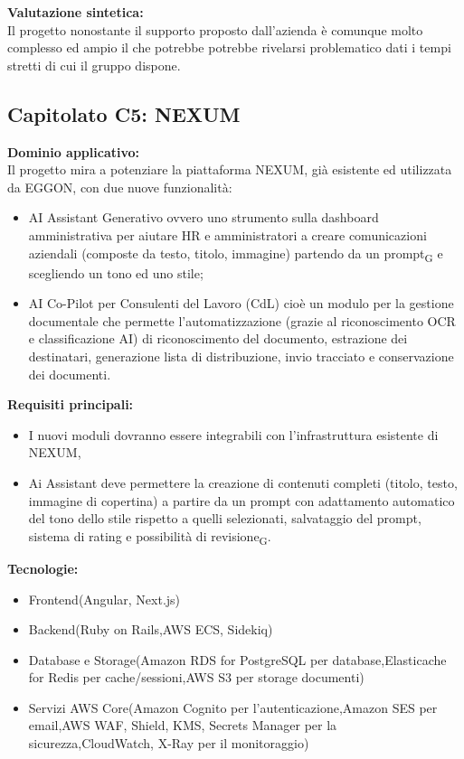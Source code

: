 \vspace{0.3cm}
\textbf{Valutazione sintetica:} \\
Il progetto nonostante il supporto proposto dall'azienda è comunque molto complesso ed ampio il che potrebbe potrebbe rivelarsi problematico dati i 
tempi stretti di cui il gruppo dispone.

\vspace{0.5cm}

\vspace{0.5cm}

\subsection{Capitolato C5: {NEXUM} }

\textbf{Dominio applicativo:} \\
{Il progetto mira a potenziare la piattaforma NEXUM, già esistente ed utilizzata da EGGON, con due nuove funzionalità:}
\begin{itemize}
    \item AI Assistant Generativo ovvero uno strumento sulla dashboard amministrativa per aiutare HR e amministratori a creare comunicazioni aziendali (composte da testo, titolo, immagine) partendo da un prompt\textsubscript{G} e scegliendo un tono ed uno stile;
    \item AI Co-Pilot per Consulenti del Lavoro (CdL) cioè un modulo per la gestione documentale che permette l’automatizzazione (grazie al riconoscimento OCR e classificazione AI) di riconoscimento del documento, estrazione dei destinatari, generazione lista di distribuzione, invio tracciato e conservazione dei documenti.
\end{itemize}
\vspace{0.3cm}

\textbf{Requisiti principali:}
\begin{itemize}
	\item I nuovi moduli dovranno essere integrabili con l’infrastruttura esistente di NEXUM,
	\item Ai Assistant deve permettere la creazione di contenuti completi (titolo, testo, immagine di copertina) a partire da un prompt con adattamento automatico del tono dello stile rispetto a quelli selezionati, salvataggio del prompt, sistema di rating e possibilità di revisione\textsubscript{G}.
\end{itemize}

\vspace{0.3cm}
\textbf{Tecnologie:}
\begin{itemize}
	\item {Frontend(Angular, Next.js)}
    \item {Backend(Ruby on Rails,AWS ECS, Sidekiq)}
    \item {Database e Storage(Amazon RDS for PostgreSQL per database,Elasticache for Redis per cache/sessioni,AWS S3 per storage documenti)}
    \item {Servizi AWS Core(Amazon Cognito per l’autenticazione,Amazon SES per email,AWS WAF, Shield, KMS, Secrets Manager per la sicurezza,CloudWatch, X-Ray per il monitoraggio)}
\end{itemize}

